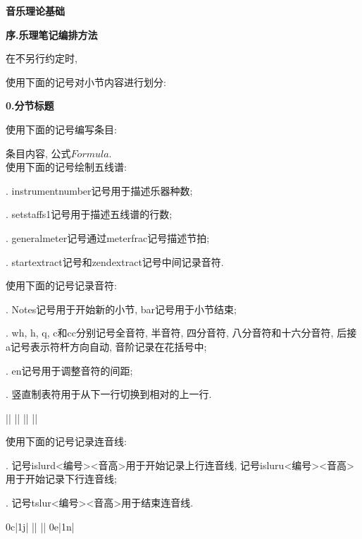 

\begin{center} 
 \Large \textbf{音乐理论基础}\par
 \textbf{序.乐理笔记编排方法}
\end{center}

\large
在不另行约定时, \par

使用下面的记号对小节内容进行划分:\par
\large 
\begin{center}
 \textbf{0.分节标题}\\
\end{center}
 
使用下面的记号编写条目:\par
[\textbf{条目名}] 条目内容, 公式$Formula$.\\

使用下面的记号绘制五线谱: \par
{}. instrumentnumber记号用于描述乐器种数;\par
{}. setstaffs1记号用于描述五线谱的行数;\par
{}. generalmeter记号通过meterfrac记号描述节拍;\par
{}. startextract记号和zendextract记号中间记录音符.\par
{}
\startextract
\zendextract

使用下面的记号记录音符:\par
{}. Notes记号用于开始新的小节, bar记号用于小节结束;\par
{}. wh, h, q, c和cc分别记号全音符, 半音符, 四分音符, 八分音符和十六分音符, 后接a记号表示符杆方向自动, 音阶记录在花括号中;\par
{}. en记号用于调整音符的间距;\par
{}. 竖直制表符用于从下一行切换到相对的上一行.\par
\startextract
    \Notes {}|\en\bar
    \Notes {}|\en\bar
    \Notes {}|\en\bar
    \NOTEs {}|\en\bar
\zendextract

\clearpage

使用下面的记号记录连音线:\par
{}. 记号islurd<编号><音高>用于开始记录上行连音线, 记号isluru<编号><音高>用于开始记录下行连音线;\par
{}. 记号tslur<编号><音高>用于结束连音线.\par
\startextract
    \Notes \islurd0c|\isluru1j\en\bar
    \Notes {}|\en\bar
    \Notes {}|\en\bar
    \NOTEs \tslur0e|\tslur1n\en\bar
\zendextract

